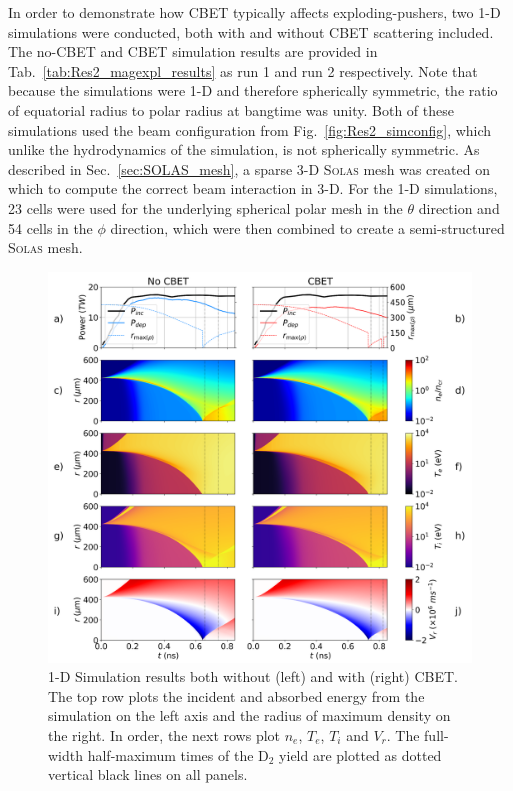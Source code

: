 In order to demonstrate how \ac{CBET} typically affects exploding-pushers, two 1-D simulations were conducted, both with and without \ac{CBET} scattering included.
The no-\ac{CBET} and \ac{CBET} simulation results are provided in Tab.~\ref{tab:Res2_magexpl_results} as run 1 and run 2 respectively.
Note that because the simulations were 1-D and therefore spherically symmetric, the ratio of equatorial radius to polar radius at bangtime was unity.
Both of these simulations used the beam configuration from Fig.~\ref{fig:Res2_simconfig}, which unlike the hydrodynamics of the simulation, is not spherically symmetric.
As described in Sec.~\ref{sec:SOLAS_mesh}, a sparse 3-D \textsc{Solas} mesh was created on which to compute the correct beam interaction in 3-D.
For the 1-D simulations, 23 cells were used for the underlying spherical polar mesh in the $\theta$ direction and 54 cells in the $\phi$ direction, which were then combined to create a semi-structured \textsc{Solas} mesh.

\begin{figure}[t!]
    \includegraphics[width=\linewidth]{Results2/Images/expl_streaks.png}
    \centering
    \caption{1-D Simulation results both without (left) and with (right) \ac{CBET}.
    The top row plots the incident and absorbed energy from the simulation on the left axis and the radius of maximum density on the right.
    In order, the next rows plot $n_e$, $T_e$, $T_i$ and $V_r$.
    The full-width half-maximum times of the D${}_{2}$ yield are plotted as dotted vertical black lines on all panels.}%
    \label{fig:Res2_expl_streaks}
\end{figure}

